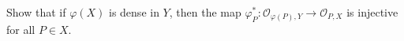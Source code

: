 Show that if $\varphi(X)$ is dense in $Y$, then the map $\varphi_P^*: \mathcal{O}_{\varphi(P), Y} \to \mathcal{O}_{P, X}$ is injective for all $P \in X$.
